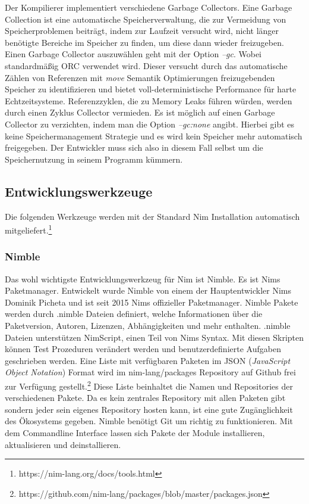 \documentclass[11pt]{report}
\begin{document}
Der Kompilierer implementiert verschiedene Garbage Collectors. Eine Garbage Collection ist eine automatische Speicherverwaltung, die zur Vermeidung von Speicherproblemen beiträgt, indem zur Laufzeit versucht wird, nicht länger benötigte Bereiche im Speicher zu finden, um diese dann wieder freizugeben.
Einen Garbage Collector auszuwählen geht mit der Option \emph{--gc}. Wobei standardmäßig ORC verwendet wird. Dieser versucht durch das automatische Zählen von Referenzen mit \emph{move} Semantik Optimierungen freizugebenden Speicher zu identifizieren und bietet voll-deterministische Performance für harte Echtzeitsysteme. Referenzzyklen, die zu Memory Leaks führen würden, werden durch einen Zyklus Collector vermieden.
Es ist möglich auf einen Garbage Collector zu verzichten, indem man die Option \emph{--gc:none} angibt. Hierbei gibt es keine Speichermanagement Strategie und es wird kein Speicher mehr automatisch freigegeben. Der Entwickler muss sich also in diesem Fall selbst um die Speichernutzung in seinem Programm kümmern.


\subsection{Entwicklungswerkzeuge}
Die folgenden Werkzeuge werden mit der Standard Nim Installation automatisch mitgeliefert.\footnote{https://nim-lang.org/docs/tools.html}

\subsubsection{Nimble}
Das wohl wichtigste Entwicklungswerkzeug für Nim ist Nimble. Es ist Nims Paketmanager. Entwickelt wurde Nimble von einem der Hauptentwickler Nims Dominik Picheta und ist seit 2015 Nims offizieller Paketmanager. Nimble Pakete werden durch .nimble Dateien definiert, welche Informationen über die Paketversion, Autoren, Lizenzen, Abhängigkeiten und mehr enthalten.
.nimble Dateien unterstützen NimScript, einen Teil von Nims Syntax. Mit diesen Skripten können Test Prozeduren verändert werden und benutzerdefinierte Aufgaben geschrieben werden.
Eine Liste mit verfügbaren Paketen im JSON (\emph{JavaScript Object Notation}) Format wird im nim-lang/packages Repository auf Github frei zur Verfügung gestellt.\footnote{https://github.com/nim-lang/packages/blob/master/packages.json} Diese Liste beinhaltet die Namen und Repositories der verschiedenen Pakete. Da es kein zentrales Repository mit allen Paketen gibt sondern jeder sein eigenes Repository hosten kann, ist eine gute Zugänglichkeit des Ökosystems gegeben.
Nimble benötigt Git um richtig zu funktionieren. Mit dem Commandline Interface lassen sich Pakete der Module installieren, aktualisieren und deinstallieren.
\end{document}
